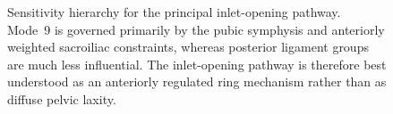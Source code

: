 \documentclass[openacc]{rsproca_new}
\begin{document}
\begin{figure}[p]
\centering
{}
\caption{Sensitivity hierarchy for the principal inlet-opening pathway. Mode~9 is governed primarily by the pubic symphysis and anteriorly weighted sacroiliac constraints, whereas posterior ligament groups are much less influential. The inlet-opening pathway is therefore best understood as an anteriorly regulated ring mechanism rather than as diffuse pelvic laxity.}
\label{fig:sensitivity}
\end{figure}

\clearpage
\printbibliography
\end{document}
